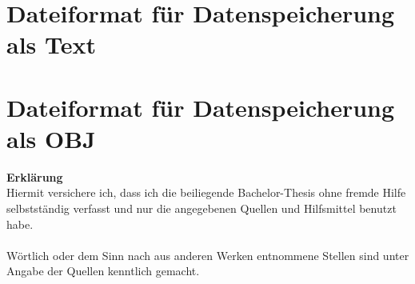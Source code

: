 \documentclass[a4paper,12pt,bibliography=totoc, listof=totoc,titlepage,pointlessnumbers]{scrreprt}
\begin{document}
\begin{appendices}
\section{Dateiformat für Datenspeicherung als Text}
\label{a:AusgabeTXT}


\section{Dateiformat für Datenspeicherung als OBJ}
\label{a:AusgabeOBJ}



\end{appendices}

\newpage
\noindent\textbf{\large Erklärung}\\
Hiermit versichere ich, dass ich die beiliegende Bachelor-Thesis ohne fremde Hilfe selbst\-stän\-dig verfasst und nur die angegebenen Quellen und Hilfsmittel benutzt habe.\\
\\
Wörtlich oder dem Sinn nach aus anderen Werken entnommene Stellen sind unter Angabe der Quellen kenntlich gemacht. 
\\
\\
\\
\\
\\
\end{document}
